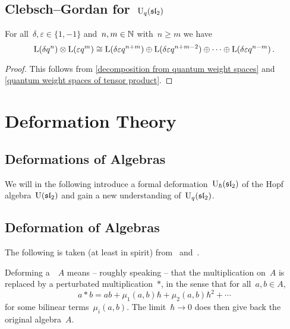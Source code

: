 \documentclass[a4paper, 11pt, oneside]{scrartcl}
\begin{document}
\subsection{Clebsch--Gordan for~$\operatorname{U}_q(\mathfrak{sl}_2)$}
\label{quantum clebsch gordan}

\begin{proposition}
  For all~$\delta, \varepsilon \in \{1, -1\}$ and~$n, m \in \mathbb{N}$ with~$n \geq m$ we have
  \[
    \operatorname{L}(\delta q^n) \otimes \operatorname{L}(\varepsilon q^m)
    \cong
    \operatorname{L}(\delta \varepsilon q^{n+m})
    \oplus
    \operatorname{L}(\delta \varepsilon q^{n+m-2})
    \oplus
    \dotsb
    \oplus
    \operatorname{L}(\delta \varepsilon q^{n-m}) \,.
  \]
\end{proposition}

\begin{proof}
  This follows from \cref{decomposition from quantum weight spaces} and \cref{quantum weight spaces of tensor product}.
\end{proof}





\section{Deformation Theory}
\label{deformation theory}



\subsection{Deformations of Algebras}

We will in the following introduce a formal deformation~$\operatorname{U}_{\hbar}(\mathfrak{sl}_2)$ of the Hopf algebra~$\operatorname{U}(\mathfrak{sl}_2)$ and gain a new understanding of~$\operatorname{U}_q(\mathfrak{sl}_2)$.



\subsection{Deformation of Algebras}

The following is taken (at least in spirit) from~\cite[\S 5.2]{pieter_hochschild} and~\cite{gerstenhaber_quantum}.

\begin{motivation}
  Deforming a~\algebra{$\kf$}~$A$ means -- roughly speaking -- that the multiplication on~$A$ is replaced by a perturbated multiplication~$*$, in the sense that for all~$a, b \in A$,
  \[
    a * b
    =
    ab + \mu_1(a,b) \hbar + \mu_2(a,b) \hbar^2 + \dotsb
  \]
  for some bilinear terms~$\mu_i(a,b)$.
  The limit~$\hbar \to 0$ does then give back the original algebra~$A$.
\end{motivation}
\end{document}
